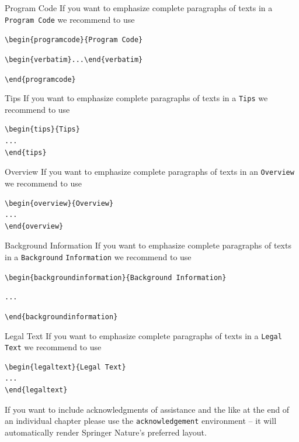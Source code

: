 \begin{programcode}{Program Code}
If you want to emphasize complete paragraphs of texts in a \verb|Program Code| we recommend to
use

\verb|\begin{programcode}{Program Code}|

\verb|\begin{verbatim}...\end{verbatim}|

\verb|\end{programcode}|

\end{programcode}
%
\begin{tips}{Tips}
If you want to emphasize complete paragraphs of texts in a \verb|Tips| we recommend to
use  \begin{verbatim}\begin{tips}{Tips}
...
\end{tips}\end{verbatim}
\end{tips}
%
%
\begin{overview}{Overview}
If you want to emphasize complete paragraphs of texts in an \verb|Overview| we recommend to
use  \begin{verbatim}\begin{overview}{Overview}
...
\end{overview}\end{verbatim}
\end{overview}
\clearpage
\begin{backgroundinformation}{Background Information}
If you want to emphasize complete paragraphs of texts in a \verb|Background|
\verb|Information| we recommend to
use

\verb|\begin{backgroundinformation}{Background Information}|

\verb|...|

\verb|\end{backgroundinformation}|
\end{backgroundinformation}
\begin{legaltext}{Legal Text}
If you want to emphasize complete paragraphs of texts in a \verb|Legal Text| we recommend to
use  \begin{verbatim}\begin{legaltext}{Legal Text}
...
\end{legaltext}\end{verbatim}
\end{legaltext}
%
\begin{acknowledgement}
If you want to include acknowledgments of assistance and the like at the end of an individual chapter please use the \verb|acknowledgement| environment -- it will automatically render Springer Nature's preferred layout.
\end{acknowledgement}
%
